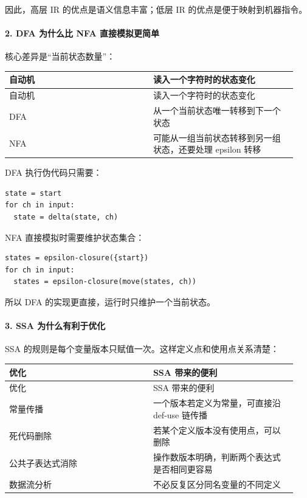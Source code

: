 \documentclass[UTF8]{ctexart}
\begin{document}
因此，高层 IR 的优点是语义信息丰富；低层 IR 的优点是便于映射到机器指令。

\paragraph*{2. DFA 为什么比 NFA 直接模拟更简单}

核心差异是“当前状态数量”：

\begin{longtable}{|p{0.47\linewidth}|p{0.47\linewidth}|}
\hline
自动机 & 读入一个字符时的状态变化 \\
\hline
\endfirsthead
自动机 & 读入一个字符时的状态变化 \\
\hline
\endhead
DFA & 从一个当前状态唯一转移到下一个状态 \\
\hline
NFA & 可能从一组当前状态转移到另一组状态，还要处理 epsilon 转移 \\
\hline
\end{longtable}

DFA 执行伪代码只需要：

\begin{Verbatim}[fontsize=\small,breaklines=true]
state = start
for ch in input:
  state = delta(state, ch)
\end{Verbatim}

NFA 直接模拟时需要维护状态集合：

\begin{Verbatim}[fontsize=\small,breaklines=true]
states = epsilon-closure({start})
for ch in input:
  states = epsilon-closure(move(states, ch))
\end{Verbatim}

所以 DFA 的实现更直接，运行时只维护一个当前状态。

\paragraph*{3. SSA 为什么有利于优化}

SSA 的规则是每个变量版本只赋值一次。这样定义点和使用点关系清楚：

\begin{longtable}{|p{0.47\linewidth}|p{0.47\linewidth}|}
\hline
优化 & SSA 带来的便利 \\
\hline
\endfirsthead
优化 & SSA 带来的便利 \\
\hline
\endhead
常量传播 & 一个版本若定义为常量，可直接沿 def-use 链传播 \\
\hline
死代码删除 & 若某个定义版本没有使用点，可以删除 \\
\hline
公共子表达式消除 & 操作数版本明确，判断两个表达式是否相同更容易 \\
\hline
数据流分析 & 不必反复区分同名变量的不同定义 \\
\hline
\end{longtable}
\end{document}
